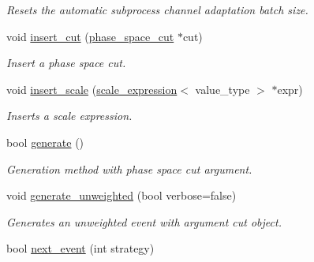 \begin{DoxyCompactItemize}
\begin{DoxyCompactList}\small\item\em Resets the automatic subprocess channel adaptation batch size. \end{DoxyCompactList}\item 
\hypertarget{a00212_a023aec911a2b9fc2b94693325f371a0f}{}void \hyperlink{a00212_a023aec911a2b9fc2b94693325f371a0f}{insert\+\_\+cut} (\hyperlink{a00419}{phase\+\_\+space\+\_\+cut} $\ast$cut)\label{a00212_a023aec911a2b9fc2b94693325f371a0f}

\begin{DoxyCompactList}\small\item\em Insert a phase space cut. \end{DoxyCompactList}\item 
\hypertarget{a00212_ad0443bf8c289972eb5e4ed6f971d9efa}{}void \hyperlink{a00212_ad0443bf8c289972eb5e4ed6f971d9efa}{insert\+\_\+scale} (\hyperlink{a00502}{scale\+\_\+expression}$<$ value\+\_\+type $>$ $\ast$expr)\label{a00212_ad0443bf8c289972eb5e4ed6f971d9efa}

\begin{DoxyCompactList}\small\item\em Inserts a scale expression. \end{DoxyCompactList}\item 
\hypertarget{a00212_a05eabe92d7a8c45ac8cdd75bc97055df}{}bool \hyperlink{a00212_a05eabe92d7a8c45ac8cdd75bc97055df}{generate} ()\label{a00212_a05eabe92d7a8c45ac8cdd75bc97055df}

\begin{DoxyCompactList}\small\item\em Generation method with phase space cut argument. \end{DoxyCompactList}\item 
\hypertarget{a00212_a178f97ea294f513c157aff88b66a1046}{}void \hyperlink{a00212_a178f97ea294f513c157aff88b66a1046}{generate\+\_\+unweighted} (bool verbose=false)\label{a00212_a178f97ea294f513c157aff88b66a1046}

\begin{DoxyCompactList}\small\item\em Generates an unweighted event with argument cut object. \end{DoxyCompactList}\item 
\hypertarget{a00212_a18c627a5357c5aea36ff59fa393c5b14}{}bool \hyperlink{a00212_a18c627a5357c5aea36ff59fa393c5b14}{next\+\_\+event} (int strategy)\label{a00212_a18c627a5357c5aea36ff59fa393c5b14}


\end{DoxyCompactItemize}
